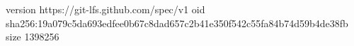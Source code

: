 version https://git-lfs.github.com/spec/v1
oid sha256:19a079c5da693edfee0b67c8dad657c2b41e350f542c55fa84b74d59b4de38fb
size 1398256
